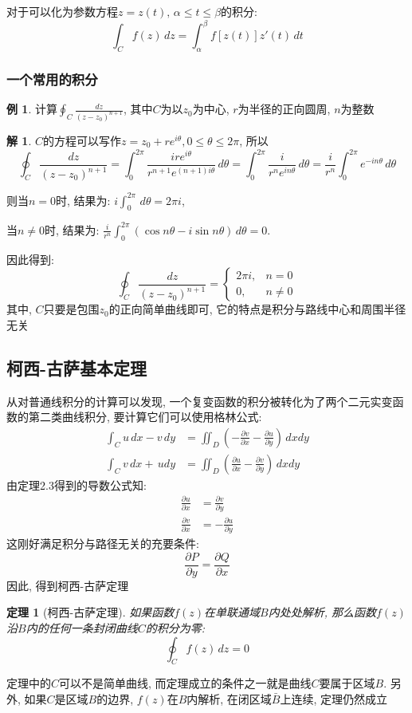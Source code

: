 \documentclass[12pt, a4paper, oneside]{ctexart}
\theoremstyle{plain}
\newtheorem{theorem}{定理}[section]
\theoremstyle{definition}
\newtheorem{example}{例}
\theoremstyle{definition}
\newtheorem*{solution}{解}
\begin{document}
对于可以化为参数方程$z=z(t),\,\alpha\leq t\leq\beta$的积分:
\[
    \int_{C}f(z)\,dz=\int_{\alpha}^{\beta}f[z(t)]z'(t)\,dt
\]
\subsubsection{一个常用的积分}
\begin{example}
    计算$\oint_{C}\frac{dz}{(z-z_{0})^{n+1}}$, 其中$C$为以$z_{0}$为中心, $r$为半径的正向圆周, $n$为整数
\end{example}
\begin{solution}
    $C$的方程可以写作$z=z_{0}+re^{i\theta},0\leq\theta\leq2\pi$, 所以
    \[
        \oint_{C}\frac{dz}{(z-z_{0})^{n+1}}=\int_{0}^{2\pi}\frac{ire^{i\theta}}{r^{n+1}e^{(n+1)i\theta}}\,d\theta
        =\int_{0}^{2\pi}\frac{i}{r^{n}e^{in\theta}}\,d\theta=\frac{i}{r^{n}}\int_{0}^{2\pi}e^{-in\theta}\,d\theta
    \]

    则当$n=0$时, 结果为: $i\int_{0}^{2\pi}\,d\theta=2\pi i$,

    当$n\neq0$时, 结果为: $\frac{i}{r^{n}}\int_{0}^{2\pi}(\cos n\theta-i\sin n\theta)\,d\theta=0$.
\end{solution}
    \noindent 因此得到: 
    \[
        \oint_{C}\frac{dz}{(z-z_{0})^{n+1}}=
        \begin{cases}
            2\pi i, & n=0\\
            0, &n\neq 0
        \end{cases}
    \]
    其中, $C$只要是包围$z_{0}$的正向简单曲线即可, 它的特点是积分与路线中心和周围半径无关
\subsection{柯西-古萨基本定理}
从对普通线积分的计算可以发现, 一个复变函数的积分被转化为了两个二元实变函数的第二类曲线积分, 要计算它们可以使用格林公式:
\begin{align*}
    \int_{C}u\,dx-v\,dy &= \iint_{D}(-\frac{\partial v}{\partial x}-\frac{\partial u}{\partial y})\,dxdy \\
    \int_{C}v\,dx+\,udy &= \iint_{D}(\frac{\partial u}{\partial x}-\frac{\partial v}{\partial y})\,dxdy
\end{align*}
由定理2.3得到的导数公式知:
\begin{align*}
\frac{\partial u}{\partial x} &= \frac{\partial v}{\partial y}\\
\frac{\partial v}{\partial x} &= -\frac{\partial u}{\partial y}
\end{align*}
这刚好满足积分与路径无关的充要条件:
\[
    \frac{\partial P}{\partial y}=\frac{\partial Q}{\partial x}
\]
因此, 得到柯西-古萨定理
\begin{theorem}[柯西-古萨定理]
    如果函数$f(z)$在单联通域$B$内处处解析, 那么函数$f(z)$沿$B$内的任何一条封闭曲线$C$的积分为零:
    \[
    \oint_{C}f(z)\,dz=0
    \]
\end{theorem}
定理中的$C$可以不是简单曲线, 而定理成立的条件之一就是曲线$C$要属于区域$B$. 另外, 如果$C$是区域$B$的边界,
$f(z)$在$B$内解析, 在闭区域$\bar{B}$上连续, 定理仍然成立
\end{document}
